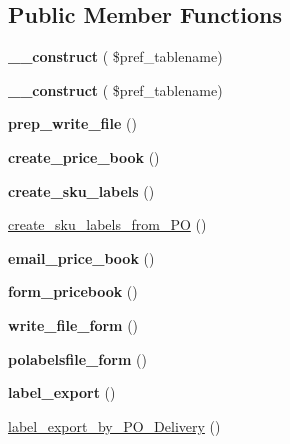 \subsection*{Public Member Functions}
\begin{DoxyCompactItemize}
\item 
\hypertarget{classksf__generate__catalogue_a62c6426c5da97539abe147da4858ddee}{}\label{classksf__generate__catalogue_a62c6426c5da97539abe147da4858ddee} 
{\bfseries \+\_\+\+\_\+construct} ( \$pref\+\_\+tablename)
\item 
\hypertarget{classksf__generate__catalogue_a62c6426c5da97539abe147da4858ddee}{}\label{classksf__generate__catalogue_a62c6426c5da97539abe147da4858ddee} 
{\bfseries \+\_\+\+\_\+construct} ( \$pref\+\_\+tablename)
\item 
\hypertarget{classksf__generate__catalogue_a4a992db7cec6b25c91ed4a7f442fd7d4}{}\label{classksf__generate__catalogue_a4a992db7cec6b25c91ed4a7f442fd7d4} 
{\bfseries prep\+\_\+write\+\_\+file} ()
\item 
\hypertarget{classksf__generate__catalogue_a64728d4da61510a9a3acb5953fa0bfdc}{}\label{classksf__generate__catalogue_a64728d4da61510a9a3acb5953fa0bfdc} 
{\bfseries create\+\_\+price\+\_\+book} ()
\item 
\hypertarget{classksf__generate__catalogue_a727667dd018f1855cddae13cba43e89d}{}\label{classksf__generate__catalogue_a727667dd018f1855cddae13cba43e89d} 
{\bfseries create\+\_\+sku\+\_\+labels} ()
\item 
\hyperlink{classksf__generate__catalogue_a4a0e6c124aeb3ecc1078183b462f74d2}{create\+\_\+sku\+\_\+labels\+\_\+from\+\_\+\+PO} ()
\item 
\hypertarget{classksf__generate__catalogue_a94e7cc96f637746a840ba8c887f26338}{}\label{classksf__generate__catalogue_a94e7cc96f637746a840ba8c887f26338} 
{\bfseries email\+\_\+price\+\_\+book} ()
\item 
\hypertarget{classksf__generate__catalogue_a9b66cc71e9240a3a1e6dfdb980bc6c8d}{}\label{classksf__generate__catalogue_a9b66cc71e9240a3a1e6dfdb980bc6c8d} 
{\bfseries form\+\_\+pricebook} ()
\item 
\hypertarget{classksf__generate__catalogue_adb6450984931cd24cfc6b21cdc9ec30e}{}\label{classksf__generate__catalogue_adb6450984931cd24cfc6b21cdc9ec30e} 
{\bfseries write\+\_\+file\+\_\+form} ()
\item 
\hypertarget{classksf__generate__catalogue_a0680dd5373558234df5ec3e6ba492b8a}{}\label{classksf__generate__catalogue_a0680dd5373558234df5ec3e6ba492b8a} 
{\bfseries polabelsfile\+\_\+form} ()
\item 
\hypertarget{classksf__generate__catalogue_ad9f7b9e3916d0171cac9c28e95a2e20a}{}\label{classksf__generate__catalogue_ad9f7b9e3916d0171cac9c28e95a2e20a} 
{\bfseries label\+\_\+export} ()
\item 
\hyperlink{classksf__generate__catalogue_a23e86ab2d815a549d625fcf34df36003}{label\+\_\+export\+\_\+by\+\_\+\+P\+O\+\_\+\+Delivery} ()
\end{DoxyCompactItemize}
